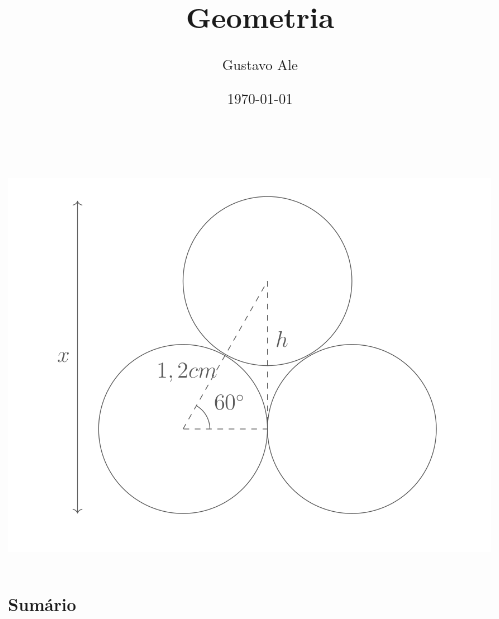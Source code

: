 \documentclass[handout]{beamer}
\title{Geometria} %
\author{Gustavo Ale} %
\institute[UFMT] %
{
EduCursinho - Faculdade de Engenharia \\ %
\medskip
\textit{gustavo.engca@gmail.com} %
}
\date{\today} %
\begin{document}
{
\begin{frame}
    \begin{columns}
        \begin{column}{0.48\textwidth}
            \includegraphics[width=\columnwidth,left]{../assets/geo.png}
        \end{column}
        \begin{column}{0.48\textwidth}
            \titlepage
        \end{column}
    \end{columns}

\end{frame}
}


\begin{frame}
    \frametitle{Sumário} %
    \tableofcontents %
\end{frame}
\end{document}
